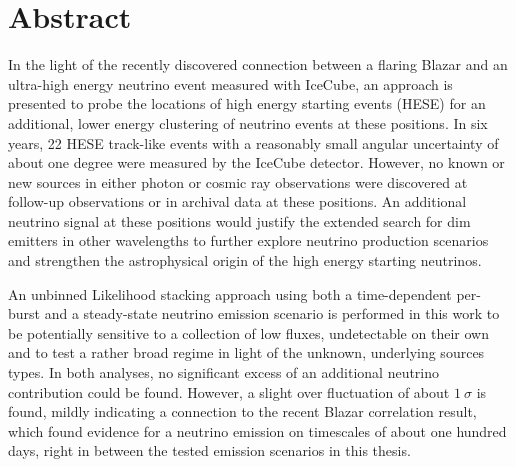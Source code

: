 \thispagestyle{plain}

\section*{Abstract}
In the light of the recently discovered connection between a flaring Blazar and an ultra-high energy neutrino event measured with IceCube, an approach is presented to probe the locations of high energy starting events (HESE) for an additional, lower energy clustering of neutrino events at these positions.
In six years, 22 HESE track-like events with a reasonably small angular uncertainty of about one degree were measured by the IceCube detector.
However, no known or new sources in either photon or cosmic ray observations were discovered at follow-up observations or in archival data at these positions.
An additional neutrino signal at these positions would justify the extended search for dim emitters in other wavelengths to further explore neutrino production scenarios and strengthen the astrophysical origin of the high energy starting neutrinos.

An unbinned Likelihood stacking approach using both a time-dependent per-burst and a steady-state neutrino emission scenario is performed in this work to be potentially sensitive to a collection of low fluxes, undetectable on their own and to test a rather broad regime in light of the unknown, underlying sources types.
In both analyses, no significant excess of an additional neutrino contribution could be found.
However, a slight over fluctuation of about $\SI{1}{\sigma}$ is found, mildly indicating a connection to the recent Blazar correlation result, which found evidence for a neutrino emission on timescales of about one hundred days, right in between the tested emission scenarios in this thesis.

